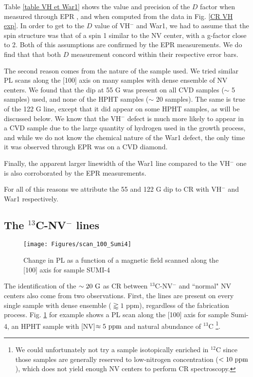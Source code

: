 \documentclass[a4paper,11pt]{report}
\begin{document}
Table \ref{table VH et War1} shows the value and precision of the $D$ factor when measured through EPR \citep{cruddace2007magnetic}, and when computed from the data in Fig. \ref{CR VH exp}. In order to get to the $D$ value of VH$^-$ and War1, we had to assume that the spin structure was that of a spin 1 similar to the NV center, with a g-factor close to 2. Both of this assumptions are confirmed by the EPR measurements. We do find that that both $D$ measurement concord within their respective error bars.

The second reason comes from the nature of the sample used. We tried similar PL scans along the [100] axis on many samples with dense ensemble of NV centers. We found that the dip at 55 G was present on all CVD samples ($\sim$ 5 samples) used, and none of the HPHT samples ($\sim$ 20 samples). The same is true of the 122 G line, except that it did appear on some HPHT samples, as will be discussed below. We know that the VH$^-$ defect is much more likely to appear in a CVD sample due to the large quantity of hydrogen used in the growth process, and while we do not know the chemical nature of the War1 defect, the only time it was observed through EPR was on a CVD diamond.

Finally, the apparent larger linewidth of the War1 line compared to the VH$^-$ one is also corroborated by the EPR measurements.

For all of this reasons we attribute the 55 and 122 G dip to CR with VH$^-$ and War1 respectively.

\subsection{The $^{13}$C-NV$^-$ lines}

\begin{figure}[h]
\centering
\texttt{[image: Figures/scan\_100\_Sumi4]}
\caption{Change in PL as a function of a magnetic field scanned along the [100] axis for sample SUMI-4}
\label{scan sumi 4}
\end{figure}

The identification of the $\sim 20\ \rm G$ as CR between $^{13}$C-NV$^-$ and ``normal" NV centers also come from two observations. First, the lines are present on every single sample with dense ensemble ($\gtrapprox 1$ ppm), regardless of the fabrication process. Fig. \ref{scan sumi 4} for example shows a PL scan along the [100] axis for sample Sumi-4, an HPHT sample with [NV]$\approx 5\ \rm ppm$ and natural abundance of $^{13}$C \footnote{We could unfortunately not try a sample isotopically enriched in $^{12}$C since those samples are generally reserved to low-nitrogen concentration ($< 10\ \rm ppm$), which does not yield enough NV centers to perform CR spectroscopy. }. 
\end{document}
